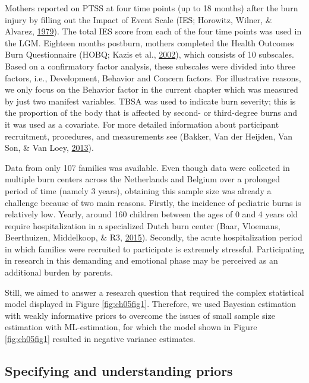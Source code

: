 \documentclass[openright,titlepage,12pt,a4paper]{book}
\begin{document}
Mothers reported on PTSS at four time points (up to 18 months) after the burn injury by filling out the Impact of Event Scale (IES; Horowitz, Wilner, \& Alvarez, \protect\hyperlink{ref-horowitz_impact_1979}{1979}). The total IES score from each of the four time points was used in the LGM. Eighteen months postburn, mothers completed the Health Outcomes Burn Questionnaire (HOBQ; Kazis et al., \protect\hyperlink{ref-kazis_development_2002}{2002}), which consists of 10 subscales. Based on a confirmatory factor analysis, these subscales were divided into three factors, i.e., Development, Behavior and Concern factors. For illustrative reasons, we only focus on the Behavior factor in the current chapter which was measured by just two manifest variables. TBSA was used to indicate burn severity; this is the proportion of the body that is affected by second- or third-degree burns and it was used as a covariate. For more detailed information about participant recruitment, procedures, and measurements see (Bakker, Van der Heijden, Van Son, \& Van Loey, \protect\hyperlink{ref-bakker_course_2013}{2013}).

Data from only 107 families was available. Even though data were collected in multiple burn centers across the Netherlands and Belgium over a prolonged period of time (namely 3 years), obtaining this sample size was already a challenge because of two main reasons. Firstly, the incidence of pediatric burns is relatively low. Yearly, around 160 children between the ages of 0 and 4 years old require hospitalization in a specialized Dutch burn center (Baar, Vloemans, Beerthuizen, Middelkoop, \& R3, \protect\hyperlink{ref-van_baar_epidemiologie_2015}{2015}). Secondly, the acute hospitalization period in which families were recruited to participate is extremely stressful. Participating in research in this demanding and emotional phase may be perceived as an additional burden by parents.

Still, we aimed to answer a research question that required the complex statistical model displayed in Figure \ref{fig:ch05fig1}. Therefore, we used Bayesian estimation with weakly informative priors to overcome the issues of small sample size estimation with ML-estimation, for which the model shown in Figure \ref{fig:ch05fig1} resulted in negative variance estimates.

\hypertarget{specifying-and-understanding-priors}{%
\subsection{Specifying and understanding priors}\label{specifying-and-understanding-priors}}
\end{document}

